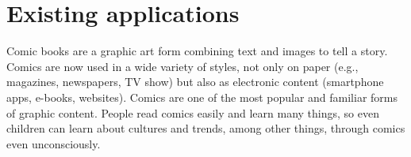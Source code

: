 
\section{Existing applications}
\label{sec:sota:applications}





Comic books are a graphic art form combining text and images to tell a story.
Comics are now used in a wide variety of styles, not only on paper (e.g., magazines, newspapers, TV show) but also as electronic content (smartphone apps, e-books, websites).
Comics are one of the most popular and familiar forms of graphic content.
People read comics easily and learn many things, so even children can learn about cultures and trends, among other things, through comics even unconsciously.

